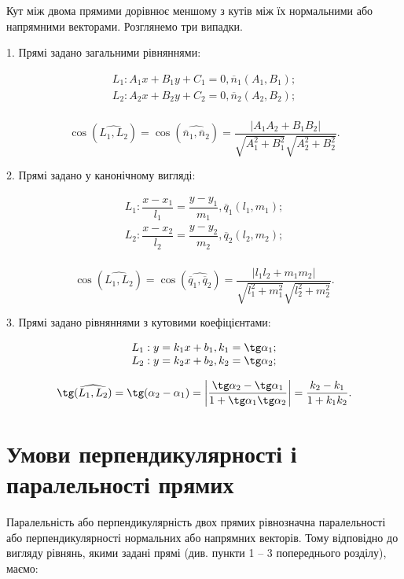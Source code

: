 Кут між двома прямими дорівнює меншому з кутів між їх нормальними або
напрямними векторами. Розглянемо три випадки.

1. Прямі задано загальними рівняннями:

$$\begin{array}{l}
	L_1: A_1x + B_1y + C_1 = 0, \overline{n}_1(A_1,B_1); \\
	L_2: A_2x + B_2y + C_2 = 0, \overline{n}_2(A_2,B_2); \\
\end{array}$$

$$\cos(\widehat{L_1,L_2})
= \cos(\widehat{\overline{n}_1, \overline{n}_2})
= \dfrac{|A_1A_2 + B_1B_2|}{\sqrt{A_1^2+ B_1^2}\sqrt{A_2^2+ B_2^2}}.$$

2. Прямі задано у канонічному вигляді:

$$\begin{array}{l}
	L_1: \dfrac{x - x_1}{l_1} = \dfrac{y - y_1}{m_1}, \overline{q}_1(l_1,m_1); \\
	L_2: \dfrac{x - x_2}{l_2} = \dfrac{y - y_2}{m_2}, \overline{q}_2(l_2,m_2); \\
\end{array}$$

$$\cos(\widehat{L_1,L_2})
= \cos(\widehat{\overline{q}_1, \overline{q}_2})
= \dfrac{|l_1l_2 + m_1m_2|}{\sqrt{l_1^2+ m_1^2}\sqrt{l_2^2+ m_2^2}}.$$

3. Прямі задано рівняннями з кутовими коефіцієнтами: 

$$\begin{array}{l}
	L_1: y = k_1x + b_1, k_1 = \tg\alpha_1; \\
	L_2: y = k_2x + b_2, k_2 = \tg\alpha_2; \\
\end{array}$$

$$\tg(\widehat{L_1,L_2})
= \tg(\alpha_2 - \alpha_1)
= \left|\dfrac{\tg\alpha_2 - \tg\alpha_1}{1+\tg\alpha_1\tg\alpha_2}\right|
= \dfrac{k_2 - k_1}{1+k_1k_2}.$$

\newpage

\parbox{\textwidth - 0.6cm}{\section{Умови перпендикулярності і паралельності прямих}}

Паралельність або перпендикулярність двох прямих рівнозначна
паралельності або перпендикулярності нормальних або напрямних векторів. Тому
відповідно до вигляду рівнянь, якими задані прямі (див. пункти 1 – 3 попереднього
розділу), маємо:

